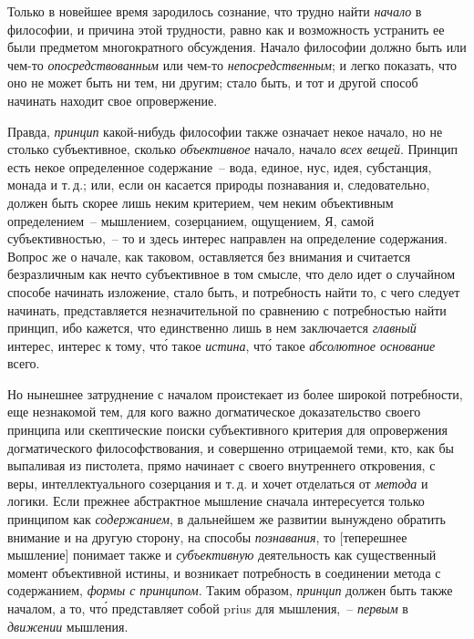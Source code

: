 Только в новейшее время зародилось сознание, что
трудно найти \emph{начало} в философии, и причина этой трудности,
равно как и возможность устранить ее были предметом
многократного обсуждения. Начало философии
должно быть или чем-то \emph{опосредствованным} или чем-то
\emph{непосредственным}; и легко показать, что оно не может
быть ни тем, ни другим; стало быть, и тот и другой способ
начинать находит свое опровержение.

Правда, \emph{принцип} какой-нибудь философии также
означает некое начало, но не столько субъективное,
сколько \emph{объективное} начало, начало \emph{всех вещей}. Принцип
есть некое определенное содержание~-- вода, единое,
нус, идея, субстанция, монада\endnotemark{} и т.\,д.; или, если он касается
природы познавания и, следовательно, должен
быть скорее лишь неким критерием, чем неким объективным
определением~-- мышлением, созерцанием, ощущением,
Я, самой субъективностью,~-- то и здесь интерес
направлен на определение содержания. Вопрос же о начале,
как таковом, оставляется без внимания и считается
безразличным как нечто субъективное в том смысле, что
дело идет о случайном способе начинать изложение, стало
быть, и потребность найти то, с чего следует начинать,
представляется незначительной по сравнению с потребностью
найти принцип, ибо кажется, что единственно
лишь в нем заключается \emph{главный} интерес, интерес
к тому, чт\'о такое \emph{истина}, чт\'о такое \emph{абсолютное основание}
всего.


Но нынешнее затруднение с началом проистекает из
более широкой потребности, еще незнакомой тем, для
кого важно догматическое доказательство своего принципа
или скептические поиски субъективного критерия
для опровержения догматического философствования, и
совершенно отрицаемой теми, кто, как бы выпаливая из
пистолета\endnotemark{}, прямо начинает с своего внутреннего откровения,
с веры, интеллектуального созерцания и т.\,д. и
хочет отделаться от \emph{метода} и логики. Если прежнее абстрактное
мышление сначала интересуется только принципом
как \emph{содержанием}, в дальнейшем же развитии вынуждено
обратить внимание и на другую сторону, на способы
\emph{познавания}, то [теперешнее мышление] понимает
также и \emph{субъективную} деятельность как существенный
момент объективной истины, и возникает потребность в
соединении метода с содержанием, \emph{формы с принципом}.
Таким образом, \emph{принцип} должен быть также началом,
а то, чт\'о представляет собой prius для мышления,~-- \emph{первым}
в \emph{движении} мышления.

